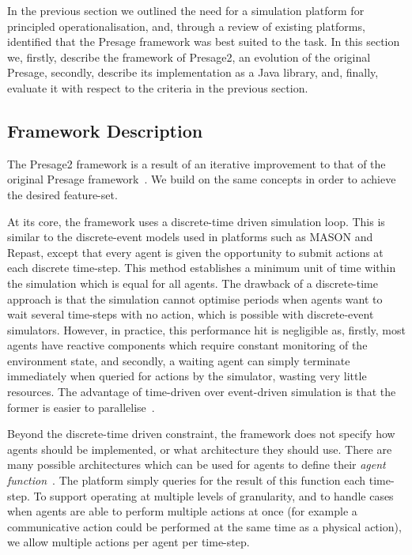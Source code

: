 In the previous section we outlined the need for a simulation platform for
principled operationalisation, and, through a review of existing platforms,
identified that the Presage framework was best suited to the task. In this
section we, firstly, describe the framework of Presage2, an evolution of the
original Presage, secondly, describe its implementation as a Java library,
and, finally, evaluate it with respect to the criteria in the previous
section.

\subsection{Framework Description}

The Presage2 framework is a result of an iterative improvement to that of the
original Presage framework~\citep{Neville:2009}. We build on the same concepts
in order to achieve the desired feature-set.

At its core, the framework uses a discrete-time driven simulation loop. This
is similar to the discrete-event models used in platforms such as MASON and
Repast, except that every agent is given the opportunity to submit actions at
each discrete time-step. This method establishes a minimum unit of time within
the simulation which is equal for all agents. The drawback of a discrete-time
approach is that the simulation cannot optimise periods when agents want to
wait several time-steps with no action, which is possible with discrete-event
simulators. However, in practice, this performance hit is negligible as,
firstly, most agents have reactive components which require constant
monitoring of the environment state, and secondly, a waiting agent can simply
terminate immediately when queried for actions by the simulator, wasting very
little resources. The advantage of time-driven over event-driven simulation is
that the former is easier to parallelise~\citep{Ferscha1995}.

Beyond the discrete-time driven constraint, the framework does not specify how
agents should be implemented, or what architecture they should use. There are
many possible architectures which can be used for agents to define their
\emph{agent function}~\citep{Rao1995,Kakas:2004bh}. The platform simply
queries for the result of this function each time-step. To support operating
at multiple levels of granularity, and to handle cases when agents are able to
perform multiple actions at once (for example a communicative action could be
performed at the same time as a physical action), we allow multiple actions
per agent per time-step.

